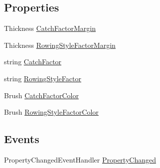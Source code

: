 \subsection*{Properties}
\begin{DoxyCompactItemize}
\item 
Thickness \hyperlink{class_rowing_monitor_1_1_view_model_1_1_rowing_meta_data_widgets_view_model_a2dedfb7b57cfcd67b61e777b14891a1e}{Catch\+Factor\+Margin}
\item 
Thickness \hyperlink{class_rowing_monitor_1_1_view_model_1_1_rowing_meta_data_widgets_view_model_acfee03e813686ca119576f0abbf83c87}{Rowing\+Style\+Factor\+Margin}
\item 
string \hyperlink{class_rowing_monitor_1_1_view_model_1_1_rowing_meta_data_widgets_view_model_a209ec36ede2c8cdbfcb12630d28218b2}{Catch\+Factor}
\item 
string \hyperlink{class_rowing_monitor_1_1_view_model_1_1_rowing_meta_data_widgets_view_model_a9d85f12031925615071fcd2a7ac53d26}{Rowing\+Style\+Factor}
\item 
Brush \hyperlink{class_rowing_monitor_1_1_view_model_1_1_rowing_meta_data_widgets_view_model_aa93ca40fd565fffd75085d27262d242b}{Catch\+Factor\+Color}
\item 
Brush \hyperlink{class_rowing_monitor_1_1_view_model_1_1_rowing_meta_data_widgets_view_model_abab0580c7f52967dc957aed741b52673}{Rowing\+Style\+Factor\+Color}
\end{DoxyCompactItemize}
\subsection*{Events}
\begin{DoxyCompactItemize}
\item 
Property\+Changed\+Event\+Handler \hyperlink{class_rowing_monitor_1_1_view_model_1_1_rowing_meta_data_widgets_view_model_a4661a90884262be4e23ae44e73db22df}{Property\+Changed}
\end{DoxyCompactItemize}


